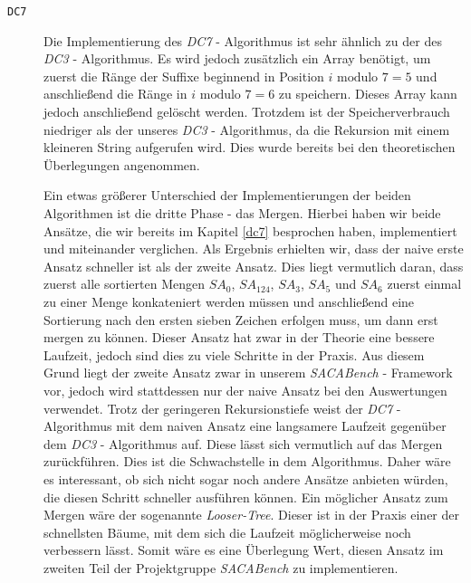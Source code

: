 \begin{description}
	\item[\texttt{DC7}]

	Die Implementierung des \emph{DC7} - Algorithmus ist sehr ähnlich zu der des \emph{DC3} - Algorithmus. Es wird jedoch zusätzlich ein Array benötigt, um zuerst die Ränge der Suffixe beginnend in Position $i \text{ modulo } 7 = 5$ und anschließend die Ränge in $i \text{ modulo } 7 = 6$ zu speichern. Dieses Array kann jedoch anschließend gelöscht werden.
	Trotzdem ist der Speicherverbrauch niedriger als der unseres \emph{DC3} - Algorithmus, da die Rekursion mit einem kleineren String aufgerufen wird. Dies wurde bereits bei den theoretischen Überlegungen angenommen.

	Ein etwas größerer Unterschied der Implementierungen der beiden Algorithmen ist die dritte Phase - das Mergen. Hierbei haben wir beide Ansätze, die wir bereits im Kapitel \ref{dc7} besprochen haben, implementiert und miteinander verglichen. Als Ergebnis erhielten wir, dass der naive erste Ansatz schneller ist als der zweite Ansatz. Dies liegt vermutlich daran, dass zuerst alle sortierten Mengen $SA_0$, $SA_{124}$, $SA_3$, $SA_5$ und  $SA_6$ zuerst einmal zu einer Menge konkateniert werden müssen und anschließend eine Sortierung nach den ersten sieben Zeichen erfolgen muss, um dann erst mergen zu können. Dieser Ansatz hat zwar in der Theorie eine bessere Laufzeit, jedoch sind dies zu viele Schritte in der Praxis. Aus diesem Grund liegt der zweite Ansatz zwar in unserem \emph{SACABench} - Framework vor, jedoch wird stattdessen nur der naive Ansatz bei den Auswertungen verwendet.
	Trotz der geringeren Rekursionstiefe weist der \emph{DC7} - Algorithmus mit dem naiven Ansatz eine langsamere Laufzeit gegenüber dem \emph{DC3} - Algorithmus auf. Diese lässt sich vermutlich auf das Mergen zurückführen. Dies ist die Schwachstelle in dem Algorithmus. Daher wäre es interessant, ob sich nicht sogar noch andere Ansätze anbieten würden, die diesen Schritt schneller ausführen können. Ein möglicher Ansatz zum Mergen wäre der sogenannte \emph{Looser-Tree}. Dieser ist in der Praxis einer der schnellsten Bäume, mit dem sich die Laufzeit möglicherweise noch verbessern lässt. Somit wäre es eine Überlegung Wert, diesen Ansatz im zweiten Teil der Projektgruppe \emph{SACABench} zu implementieren.

\end{description}
